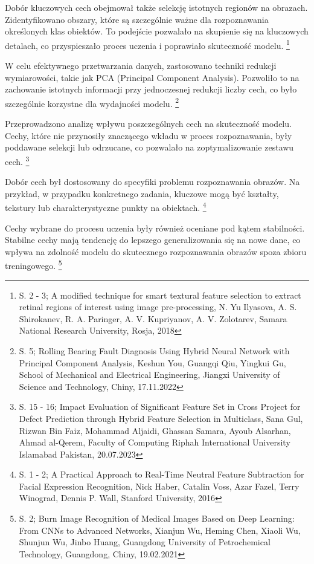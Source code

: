 \documentclass[12pt, a4paper, twoside, openany]{book}
\begin{document}
Dobór kluczowych cech obejmował także selekcję istotnych regionów na obrazach.
Zidentyfikowano obszary, które są szczególnie ważne dla rozpoznawania określonych klas obiektów.
To podejście pozwalało na skupienie się na kluczowych detalach, co przyspieszało proces uczenia i poprawiało skuteczność modelu. \footnote{ S. 2 - 3; A modified technique for smart textural feature selection to extract retinal regions of interest using image pre-processing, N. Yu Ilyasova, A. S. Shirokanev, R. A. Paringer, A. V. Kupriyanov, A. V. Zolotarev, Samara National Research University, Rosja, 2018}

W celu efektywnego przetwarzania danych, zastosowano techniki redukcji wymiarowości, takie jak PCA (Principal Component Analysis).
Pozwoliło to na zachowanie istotnych informacji przy jednoczesnej redukcji liczby cech, co było szczególnie korzystne dla wydajności modelu. \footnote{ S. 5; Rolling Bearing Fault Diagnosis Using Hybrid Neural Network with Principal Component Analysis, Keshun You, Guangqi Qiu, Yingkui Gu, School of Mechanical and Electrical Engineering, Jiangxi University of Science and Technology, Chiny, 17.11.2022}

Przeprowadzono analizę wpływu poszczególnych cech na skuteczność modelu.
Cechy, które nie przynosiły znaczącego wkładu w proces rozpoznawania, były poddawane selekcji lub odrzucane, co pozwalało na zoptymalizowanie zestawu cech. \footnote{ S. 15 - 16; Impact Evaluation of Significant Feature Set in Cross Project for Defect Prediction through Hybrid Feature Selection in Multiclass, Sana Gul, Rizwan Bin Faiz, Mohammad Aljaidi, Ghassan Samara, Ayoub Alsarhan, Ahmad al-Qerem, Faculty of Computing Riphah International University Islamabad Pakistan, 20.07.2023}

Dobór cech był dostosowany do specyfiki problemu rozpoznawania obrazów.
Na przykład, w przypadku konkretnego zadania, kluczowe mogą być kształty, tekstury lub charakterystyczne punkty na obiektach. \footnote{ S. 1 - 2; A Practical Approach to Real-Time Neutral Feature Subtraction for Facial Expression Recognition, Nick Haber, Catalin Voss, Azar Fazel, Terry Winograd, Dennis P. Wall, Stanford University, 2016}

Cechy wybrane do procesu uczenia były również oceniane pod kątem stabilności. Stabilne cechy mają tendencję do lepszego generalizowania się na nowe dane, co wpływa na zdolność modelu do skutecznego rozpoznawania obrazów spoza zbioru treningowego. \footnote{ S. 2; Burn Image Recognition of Medical Images Based on Deep Learning: From CNNs to Advanced Networks, Xianjun Wu, Heming Chen, Xiaoli Wu, Shunjun Wu, Jinbo Huang, Guangdong University of Petrochemical Technology, Guangdong, Chiny, 19.02.2021}
\end{document}
